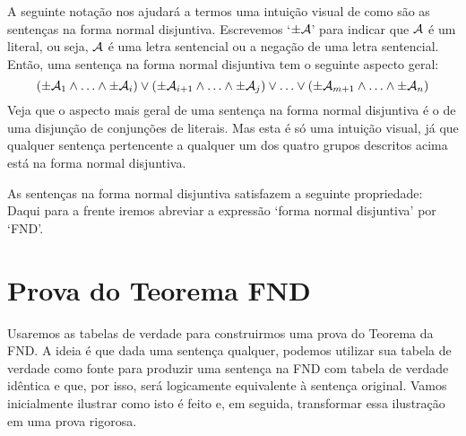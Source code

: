 A seguinte notação nos ajudará a termos uma intuição visual de como são as sentenças na forma normal disjuntiva.
Escrevemos `$\pm \mathcal{A}$' para indicar que $\mathcal{A}$ é um literal, ou seja, $\mathcal{A}$ é uma letra sentencial ou a negação de uma letra sentencial.
Então, uma sentença na forma normal disjuntiva tem o seguinte aspecto geral:
	$$(\pm \mathcal{A}_1 \land \ldots \land \pm \mathcal{A}_i) \lor (\pm \mathcal{A}_{i+1} \land \ldots \land \pm\mathcal{A}_j) \lor \ldots \lor (\pm\mathcal{A}_{m+1} \land \ldots \land \pm \mathcal{A}_n)$$
Veja que o aspecto mais geral de uma sentença na forma normal disjuntiva é o de uma disjunção de conjunções de literais.
Mas esta é só uma intuição visual, já que qualquer sentença pertencente a  qualquer um dos quatro grupos descritos acima está na forma normal disjuntiva.

As sentenças na forma normal disjuntiva satisfazem a seguinte propriedade:
Daqui para a frente iremos abreviar a expressão  `forma normal disjuntiva' por `FND'. 


\section{Prova do Teorema FND}
\label{s:DNFTruthTable}

Usaremos as tabelas de verdade para construirmos uma prova do Teorema da FND.
A ideia é que dada uma sentença qualquer, podemos utilizar sua tabela de verdade como fonte para produzir uma sentença na FND com tabela de verdade idêntica e que, por isso, será logicamente equivalente à sentença original.
Vamos inicialmente ilustrar como isto é feito e, em seguida, transformar essa ilustração em uma prova rigorosa.

